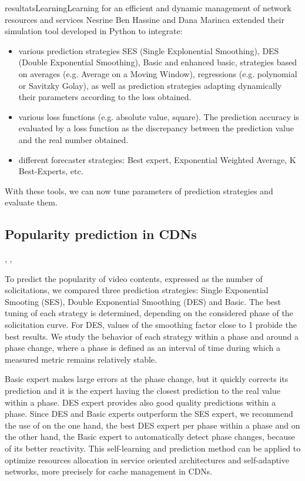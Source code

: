 \documentclass{ra2016}
\begin{document}
\begin{module}{resultats}{Learning}{Learning for an efficient and dynamic management of network resources and services}
Nesrine Ben Hassine and Dana Marinca extended their simulation tool developed in Python to integrate:
\begin{itemize}
\item various prediction strategies SES (Single Explonential Smoothing), DES (Double Exponential Smoothing), Basic and enhanced basic, strategies based on averages (e.g. Average on a Moving Window), regressions (e.g. polynomial or Savitzky Golay), as well as prediction strategies adapting dynamically their parameters according to the loss obtained.
\item various loss functions (e.g. absolute value, square). The prediction accuracy is evaluated by a loss function as the discrepancy between the prediction value and the real number obtained. 
\item different forecaster strategies: Best expert, Exponential Weighted Average, K Best-Experts, etc.
\end{itemize}

With these tools, we can now tune parameters of prediction strategies and evaluate them.

\subsection{Popularity prediction in CDNs}
\begin{participants}
,
,
\end{participants}

To predict the popularity of video contents, expressed as the number of solicitations, we compared three prediction strategies: Single Exponential Smooting (SES), Double Exponential Smoothing (DES) and Basic. The best tuning of each strategy is
determined, depending on the considered phase of the solicitation
curve. For DES, values of the smoothing factor close to 1 probide the best results. We study the behavior of each strategy within a phase and around a phase change, where a phase is defined as an interval of time
during which a measured metric remains relatively stable.

Basic expert makes large errors at the phase change,
but it quickly corrects its prediction and it is the expert having
the closest prediction to the real value within a phase. DES expert provides also good quality predictions within a phase.
Since DES and Basic experts outperform the SES expert,
we recommend the use of on the one hand, the best DES
expert per phase within a phase and on the other hand, the
Basic expert to automatically detect phase changes, because of
its better reactivity. This self-learning and prediction
method can be applied to optimize resources allocation in service
oriented architectures and self-adaptive networks, more precisely
for cache management in CDNs.


\end{module}
\end{document}
